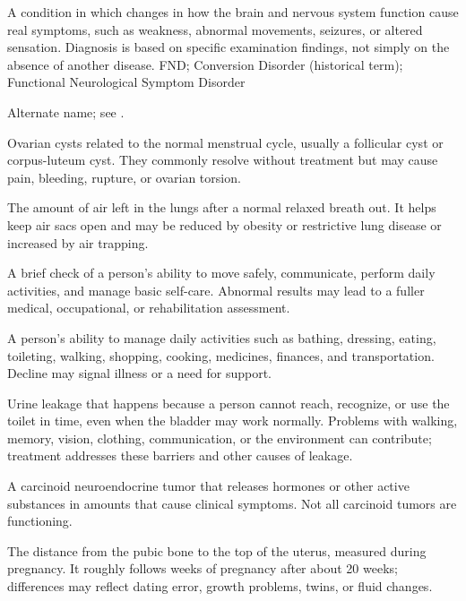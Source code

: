  A condition in which changes in how the brain and nervous system function cause real symptoms, such as weakness, abnormal movements, seizures, or altered sensation. Diagnosis is based on specific examination findings, not simply on the absence of another disease.
\synonyms
FND; Conversion Disorder (historical term); Functional Neurological Symptom Disorder

 Alternate name; see .

 Ovarian cysts related to the normal menstrual cycle, usually a follicular cyst or corpus-luteum cyst. They commonly resolve without treatment but may cause pain, bleeding, rupture, or ovarian torsion.


 The amount of air left in the lungs after a normal relaxed breath out. It helps keep air sacs open and may be reduced by obesity or restrictive lung disease or increased by air trapping.

 A brief check of a person’s ability to move safely, communicate, perform daily activities, and manage basic self-care. Abnormal results may lead to a fuller medical, occupational, or rehabilitation assessment.

 A person’s ability to manage daily activities such as bathing, dressing, eating, toileting, walking, shopping, cooking, medicines, finances, and transportation. Decline may signal illness or a need for support.

 Urine leakage that happens because a person cannot reach, recognize, or use the toilet in time, even when the bladder may work normally. Problems with walking, memory, vision, clothing, communication, or the environment can contribute; treatment addresses these barriers and other causes of leakage.

 A carcinoid neuroendocrine tumor that releases hormones or other active substances in amounts that cause clinical symptoms. Not all carcinoid tumors are functioning.

 The distance from the pubic bone to the top of the uterus, measured during pregnancy. It roughly follows weeks of pregnancy after about 20 weeks; differences may reflect dating error, growth problems, twins, or fluid changes.

